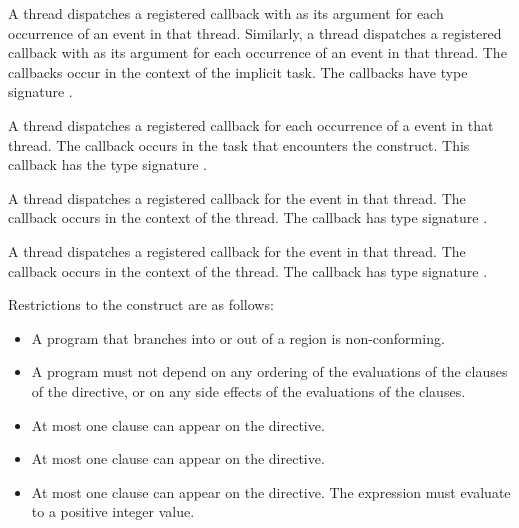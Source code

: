 A thread dispatches a registered  callback 
with  as its  argument for each occurrence 
of an  event in that thread. Similarly, a thread 
dispatches a registered  callback with 
 as its  argument for each occurrence 
of an  event in that thread. The callbacks occur in 
the context of the implicit task. The callbacks have type signature
.

A thread dispatches a registered 
callback for each occurrence of a  event in that
thread.  The callback occurs in the task that encounters the  
construct.  This callback has the type signature .

A thread dispatches a registered 
callback for the  event in that thread. The callback 
occurs in the context of the thread.  The callback has type signature
.

A thread dispatches a registered 
callback for the  event in that thread. The callback 
occurs in the context of the thread.  The callback has type signature
.

\restrictions
Restrictions to the  construct are as follows:

\begin{itemize}
\item A program that branches into or out of a  region is 
      non-conforming.
\item A program must not depend on any ordering of the evaluations of the clauses 
      of the  directive, or on any side effects of the evaluations 
      of the clauses.
\item At most one  clause can appear on the directive.
\item At most one  clause can appear on the directive.
\item At most one  clause can appear on the directive. 
      The  expression must evaluate to a positive integer value.

\end{itemize}


